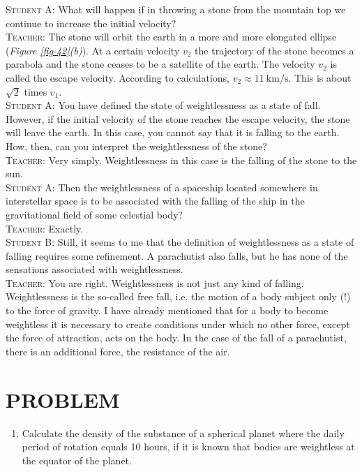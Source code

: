 \documentclass[a4paper,sfsidenotes]{tufte-book}
\begin{document}
\textsc{Student A:} What will happen if in throwing a stone from
the mountain top we continue to increase the initial velocity?
\\
\textsc{Teacher:} The stone will orbit the earth in a more and more
elongated ellipse (\emph{Figure \ref{fig-42}(b)}). At a certain velocity $v_{2}$ the trajectory of the stone becomes a parabola and the stone ceases to be a satellite of the earth. The velocity $v_{2}$ is called the escape velocity. According to calculations, $v_{2} \approx \SI[per-mode=symbol]{11}{\kilo\metre\per\second}$. This is about $\sqrt{2}$ times $v_{1}$.
\\
\textsc{Student A:} You have defined the state of weightlessness as a state of fall. However, if
the initial velocity of the stone reaches the escape velocity, the stone will leave the earth. In this case, you cannot say that it is falling to the earth. How, then, can you interpret the weightlessness of the stone?
\\
\textsc{Teacher:} Very simply. Weightlessness in this case is the falling of the stone to the sun.
\\
\textsc{Student A:} Then the weightlessness of a spaceship located somewhere in interstellar space is to be associated with the falling of the ship in the gravitational field of some celestial body?
\\
\textsc{Teacher:} Exactly.
\\
\textsc{Student B:} Still, it seems to me that the definition of weightlessness as a state of falling requires some refinement. A parachutist also falls, but he has none of the sensations associated with weightlessness.
\\
\textsc{Teacher:} You are right. Weightlessness is not just any kind of falling. Weightlessness is the so-called free fall, i.e. the motion of a body subject only (!) to the force of gravity. I have already mentioned that for a body to become weightless it is necessary to create conditions under which no other force, except the force of attraction, acts on the body. In the case of the fall of a parachutist, there is an additional force, the resistance of the air.
\\
\section{PROBLEM}
\label{problems-04}

\begin{enumerate}[resume*=problems]
\item Calculate the density of the substance of a spherical planet where the daily period of rotation equals 10 hours, if it is known that bodies are weightless at the equator of the planet.
\end{enumerate}
\end{document}
